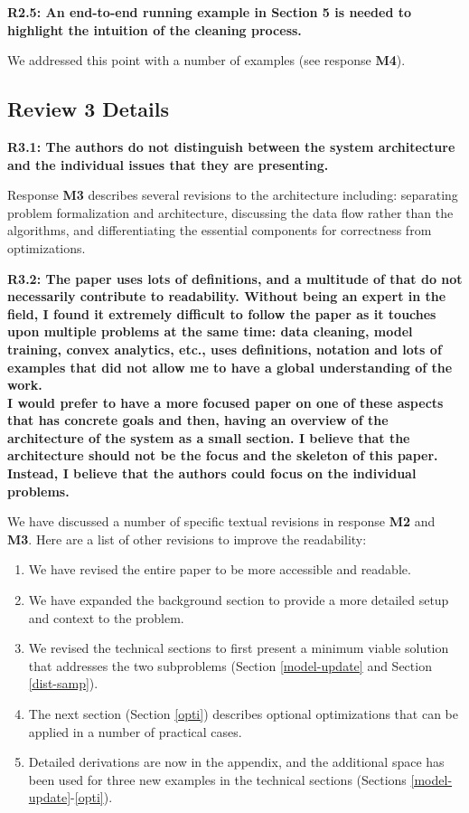 \vspace{0.5em}

\textbf{R2.5: An end-to-end running example in Section 5 is needed to highlight the intuition of the cleaning process.}

We addressed this point with a number of examples (see response \textbf{M4}).


\vspace{0.5em}


\subsection*{Review 3 Details}
\noindent\textbf{R3.1: The authors do not distinguish between the system architecture and the individual issues that they are presenting.}

Response \textbf{M3} describes several revisions to the architecture including: separating problem formalization and architecture, discussing the data flow rather than the algorithms, and differentiating the essential components for correctness from optimizations.

\vspace{0.5em}

\noindent\textbf{R3.2: The paper uses lots of definitions, and a multitude of that do not necessarily contribute to readability.
Without being an expert in the field, I found it extremely difficult to follow the paper as it touches upon multiple problems at the same time: data cleaning, model training, convex analytics, etc., uses definitions, notation and lots of examples that did not allow me to have a global understanding of the work.\\
I would prefer to have a more focused paper on one of these aspects that has concrete goals and then, having an overview of the architecture of the system as a small section. I believe that the architecture should not be the focus and the skeleton of this paper. Instead, I believe that the authors could focus on the individual problems.}

We have discussed a number of specific textual revisions in response \textbf{M2} and \textbf{M3}. Here are a list of other revisions to improve the readability:

\begin{enumerate}
\item We have revised the entire paper to be more accessible and readable.

\item We have expanded the background section to provide a more detailed setup and context to the problem.
\item We revised the technical sections to first present a minimum viable solution that addresses the two subproblems (Section \ref{model-update} and Section  \ref{dist-samp}).
\item The next section (Section \ref{opti}) describes optional optimizations that can be applied in a number of practical cases.
\item Detailed derivations are now in the appendix, and the additional space has been used for three new examples in the technical sections (Sections \ref{model-update}-\ref{opti}).
\end{enumerate}
